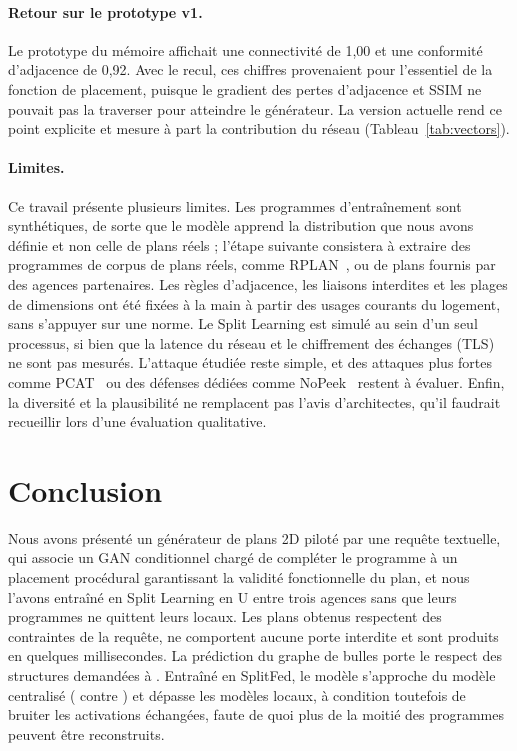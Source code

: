 \documentclass[twocolumn]{ICCKjournal}
\begin{document}
\paragraph{Retour sur le prototype v1.}
Le prototype du mémoire affichait une connectivité de 1,00 et une
conformité d'adjacence de 0,92. Avec le recul, ces chiffres provenaient
pour l'essentiel de la fonction de placement, puisque le gradient des
pertes d'adjacence et SSIM ne pouvait pas la traverser pour atteindre le
générateur. La version actuelle rend ce point explicite et mesure à part
la contribution du réseau (Tableau~\ref{tab:vectors}).

\paragraph{Limites.}
Ce travail présente plusieurs limites. Les programmes d'entraînement
sont synthétiques, de sorte que le modèle apprend la distribution que
nous avons définie et non celle de plans réels ; l'étape suivante
consistera à extraire des programmes de corpus de plans réels, comme
RPLAN~\cite{Wu2019RPLAN}, ou de plans fournis par des agences
partenaires. Les règles d'adjacence, les liaisons interdites et les
plages de dimensions ont été fixées à la main à partir des usages
courants du logement, sans s'appuyer sur une norme. Le Split Learning
est simulé au sein d'un seul processus, si bien que la latence du réseau
et le chiffrement des échanges (TLS) ne sont pas mesurés. L'attaque
étudiée reste simple, et des attaques plus fortes comme
PCAT~\cite{Gao2023PCAT} ou des défenses dédiées comme
NoPeek~\cite{Vepakomma2020NoPeek} restent à évaluer. Enfin, la diversité
et la plausibilité ne remplacent pas l'avis d'architectes, qu'il
faudrait recueillir lors d'une évaluation qualitative.


\section{Conclusion}

Nous avons présenté un générateur de plans 2D piloté par une requête
textuelle, qui associe un GAN conditionnel chargé de compléter le
programme à un placement procédural garantissant la validité
fonctionnelle du plan, et nous l'avons entraîné en Split Learning en U
entre trois agences sans que leurs programmes ne quittent leurs locaux.
Les plans obtenus respectent \resPlanCganSnapRespectPlan{} des
contraintes de la requête, ne comportent aucune porte interdite et sont
produits en quelques millisecondes. La prédiction du graphe de bulles
porte le respect des structures demandées à
\resPlanCganSnapRespectGraphe{}. Entraîné en SplitFed, le modèle s'approche
du modèle centralisé (\resSlSplitfedGlobalRespectBrut{} contre
\resSlCentraliseGlobalRespectBrut{}) et dépasse les modèles locaux, à
condition toutefois de bruiter les activations échangées, faute de quoi
plus de la moitié des programmes peuvent être reconstruits.
\end{document}
